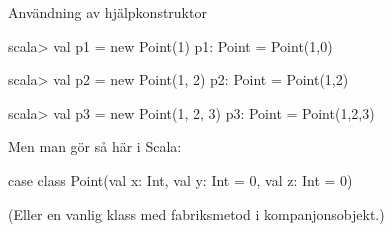 \begin{Slide}{Användning av hjälpkonstruktor}
\begin{REPL}
scala> val p1 = new Point(1)
p1: Point = Point(1,0)

scala> val p2 = new Point(1, 2)
p2: Point = Point(1,2)

scala> val p3 = new Point(1, 2, 3)
p3: Point = Point(1,2,3)
\end{REPL}
\pause
Men man gör  så här i Scala:
\begin{Code}[basicstyle=\ttfamily\SlideFontSize{8.5}{12}]
case class Point(val x: Int, val y: Int = 0, val z: Int = 0)
\end{Code}
(Eller en vanlig klass med fabriksmetod i kompanjonsobjekt.)
\end{Slide}



%
%
%
%
%



